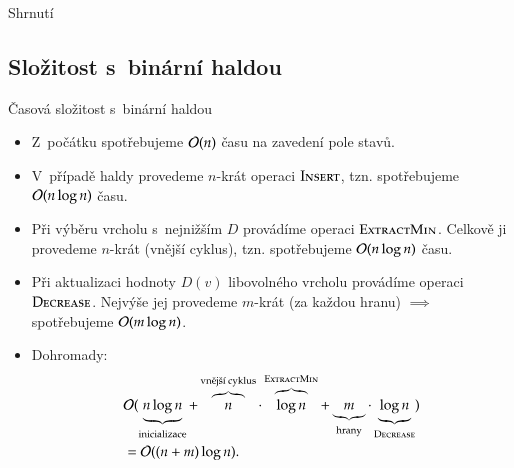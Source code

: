 \documentclass[11pt,professionalfont,aspectratio=43]{beamer}
\begin{document}
    \begin{frame}{Shrnutí}
        \begin{itemize}
        \end{itemize}
    \end{frame}

    \subsection{Složitost s~binární haldou}

    \begin{frame}{Časová složitost s~binární haldou}
        \begin{itemize}
            \item Z~počátku spotřebujeme $\mathcal{O}(n)$ času na zavedení pole stavů.
            \item V~případě haldy provedeme $n$-krát operaci $\textsc{Insert}$, tzn. spotřebujeme $\mathcal{O}(n\log{n})$ času.
            \item Při výběru vrcholu s~nejnižším $D$ provádíme operaci $\textsc{ExtractMin}$. Celkově ji provedeme $n$-krát (vnější cyklus), tzn. spotřebujeme $\mathcal{O}(n\log{n})$ času.
            \item Při aktualizaci hodnoty $D(v)$ libovolného vrcholu provádíme operaci $\textsc{Decrease}$. Nejvýše jej provedeme $m$-krát (za každou hranu) $\implies$ spotřebujeme $\mathcal{O}(m\log{n})$.
            \item Dohromady:
            \begin{align*}
                &\mathcal{O}(\underbrace{n\log{n}}_\text{inicializace}+\overbrace{n}^\text{vnější cyklus}\cdot\overbrace{\log{n}}^{\textsc{ExtractMin}}+\underbrace{m}_\text{hrany}\cdot\underbrace{\log{n}}_{\textsc{Decrease}}) \\
                &=\mathcal{O}((n+m)\log{n}).
            \end{align*}
        \end{itemize}
    \end{frame}
\end{document}
